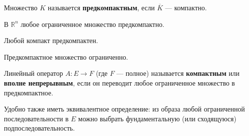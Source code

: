 \documentclass[12pt]{article}
\begin{document}
	\begin{defi}
		Множество $K$ называется \textbf{предкомпактным}, если $\overline{K}$ --- компактно.
	\end{defi}
	
	\example В $\mathbb{R}^n$ любое ограниченное множество предкомпактно.
	
	\example Любой компакт предкомпактен.
	
	\begin{note}
		Предкомпактное множество ограниченно.
	\end{note}
	
	\begin{defi}
		Линейный оператор $A:E \rightarrow F$ (где $F$ --- полное) называется \textbf{компактным} или 
		\textbf{вполне непрерывным}, если он переводит любое ограниченное множество в предкомпактное.
	\end{defi}
	
	Удобно также иметь эквивалентное определение: из образа любой ограниченной последовательности в $E$ можно выбрать 
	фундаментальную (или сходящуюся) подпоследовательность.
	
\end{document}
